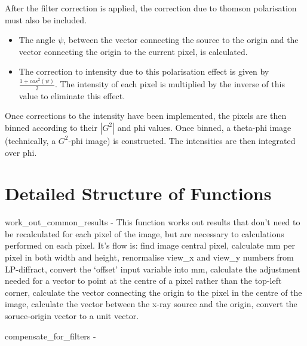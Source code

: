 \documentclass{report}
\begin{document}
After the filter correction is applied, the correction due to thomson polarisation must also be included. 

\begin{itemize}
\item The angle $\psi$, between the vector connecting the source to the origin and the vector connecting the origin to the current pixel, is calculated. 
\item The correction to intensity due to this polarisation effect is given by $\frac{1 + cos^2(\psi)}{2}$. The intensity of each pixel is multiplied by the inverse of this value to eliminate this effect.
\end{itemize}

Once corrections to the intensity have been implemented, the pixels are then binned according to their $|G^2|$ and phi values. Once binned, a theta-phi image (technically, a $G^2$-phi image) is constructed. The intensities are then integrated over phi.

\section{Detailed Structure of Functions}

work\_out\_common\_results - This function works out results that don't need to be recalculated for each pixel of the image, but are necessary to calculations performed on each pixel. It's flow is: find image central pixel, calculate mm per pixel in both width and height, renormalise view\_x and view\_y numbers from LP-diffract, convert the `offset' input variable into mm, calculate the adjustment needed for a vector to point at the centre of a pixel rather than the top-left corner, calculate the vector connecting the origin to the pixel in the centre of the image, calculate the vector between the x-ray source and the origin, convert the soruce-origin vector to a unit vector.

compensate\_for\_filters - 
\end{document}
